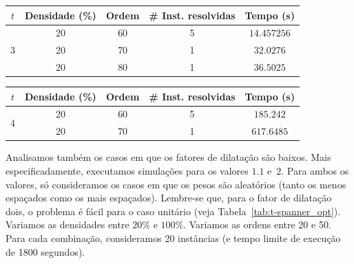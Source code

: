 \begin{center}
\noindent
\footnotesize{
\begin{tabular}{|c|c|c|c|c|}\hline
{$t$} & {Densidade (\%)} & {Ordem} & {\# Inst. resolvidas} & {Tempo (s)}
\\ \hline\hline
\multirow{3}{*}{3}	&	20	&	60	&	5	&	$\num{14,457256}$	\\
	&	20	&	70	&	1	&	$\num{32,0276}$	\\
	&	20	&	80	&	1	&	$\num{36,5025}$	\\
\hline\hline
\end{tabular}
}
\label{tab:tree_labels_unit_big_size}
\end{center}

\begin{center}
\noindent
\footnotesize{
\begin{tabular}{|c|c|c|c|c|}\hline
{$t$} & {Densidade (\%)} & {Ordem} & {\# Inst. resolvidas} & {Tempo (s)}
\\ \hline\hline
\multirow{2}{*}{4}	&	20	&	60	&	5	&	$\num{185,242}$
	\\
	&	20	&	70	&	1	&	$\num{617,6485}$
\\
\hline\hline
\end{tabular}
}
\label{tab:tree_find_unit_big_size}
\end{center}


Analisamos também os casos em que os fatores de dilatação são baixos.
Mais especificadamente, executamos simulações para os valores $\num{1,1}$
e~$2$. Para ambos os valores, só consideramos os casos em que os pesos
são aleatórios (tanto os menos espaçados como os mais espaçados).
Lembre-se que, para o fator de dilatação dois, o problema é fácil para
o caso unitário (veja Tabela~\ref{tab:t-spanner_opt}). Variamos as
densidades entre $20\%$ e $100\%$. Variamos as ordens entre 20 e 50.
Para cada combinação, consideramos 20 instâncias (e tempo limite de
execução de 1800 segundos).


